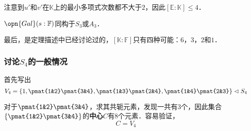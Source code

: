 注意到$u'$和$v'$在$\mathbb{K}$上的最小多项式次数都不大于$2$，因此$[\mathbb{E}:\mathbb{K}]\leq 4$．

$\opn{Gal}(s:\mathbb{F})$同构于$S_3$或$A_3$．

最后，是定理描述中已经讨论过的，$[\mathbb{K}:\mathbb{F}]$只有四种可能：$6$，$3$，$2$和$1$．

\subsubsection{讨论$S_4$的一般情况}

首先写出
\begin{equation}
V_4=\{1, \pmat{1&2}\pmat{3&4}, \pmat{1&3}\pmat{2&4}, \pmat{1&4}\pmat{2&3}\}\vartriangleleft S_4
\end{equation}

对于$\pmat{1&2}\pmat{3&4}$，求其共轭元素，发现一共有$3$个，因此集合$\{\pmat{1&2}\pmat{3&4}\}$的\textbf{中心}$C$有$8$个元素．容易验证，
\begin{equation}
C = V_4
\end{equation}








